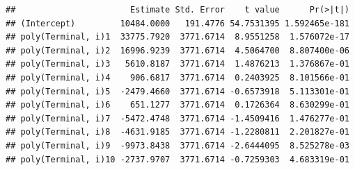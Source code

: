 \documentclass[]{article}
\begin{document}
\begin{verbatim}
##                       Estimate Std. Error    t value      Pr(>|t|)
## (Intercept)         10484.0000   191.4776 54.7531395 1.592465e-181
## poly(Terminal, i)1  33775.7920  3771.6714  8.9551258  1.576072e-17
## poly(Terminal, i)2  16996.9239  3771.6714  4.5064700  8.807400e-06
## poly(Terminal, i)3   5610.8187  3771.6714  1.4876213  1.376867e-01
## poly(Terminal, i)4    906.6817  3771.6714  0.2403925  8.101566e-01
## poly(Terminal, i)5  -2479.4660  3771.6714 -0.6573918  5.113301e-01
## poly(Terminal, i)6    651.1277  3771.6714  0.1726364  8.630299e-01
## poly(Terminal, i)7  -5472.4748  3771.6714 -1.4509416  1.476277e-01
## poly(Terminal, i)8  -4631.9185  3771.6714 -1.2280811  2.201827e-01
## poly(Terminal, i)9  -9973.8438  3771.6714 -2.6444095  8.525278e-03
## poly(Terminal, i)10 -2737.9707  3771.6714 -0.7259303  4.683319e-01
\end{verbatim}
\end{document}
